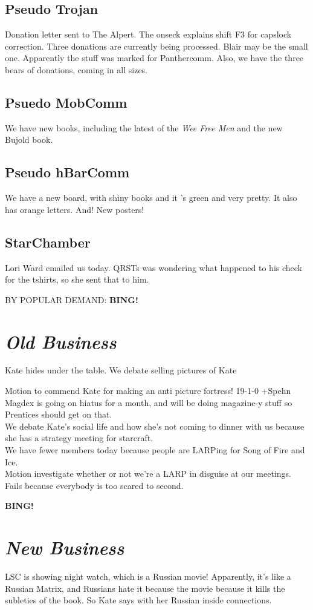 \documentclass[10pt]{article}
\newcommand{\bing}{{\bf BING!} }
\newcommand{\goto}[1]{\bing \vskip 12pt \section*{{\em{#1}}}}
\begin{document}
\subsection*{Pseudo Trojan}
Donation letter sent to The Alpert. The onseck explains shift F3 for
capslock correction. Three donations are currently being processed.
Blair may be the small one. Apparently the stuff was marked for
Panthercomm.  Also, we have the three bears of donations, coming in
all sizes.


\subsection*{Psuedo MobComm}
We have new books, including the latest of the \emph{Wee Free Men} and the new Bujold book. 

\subsection*{Pseudo hBarComm}
We have a new board, with shiny books and it 's green and very pretty. It also has orange letters. And! New posters!

\subsection*{StarChamber}
Lori Ward emailed us today. QRSTs was wondering what happened to his check for the tshirts, so she sent that to him.

BY POPULAR DEMAND:
\goto{Old Business}
Kate hides under the table. We debate selling pictures of Kate

Motion to commend Kate for making an anti picture fortress! 19-1-0 +Spehn\\
Magdex is going on hiatus for a month, and will be doing magazine-y stuff so Prentices should get on that. \\
We debate Kate's social life and how she's not coming to dinner with us because she has a strategy meeting for starcraft.\\
We have fewer members today because people are LARPing for Song of Fire and Ice.\\
Motion investigate whether or not we're a LARP in disguise at our meetings. Fails because everybody is too scared to second. 

\goto{New Business}
LSC is showing night watch, which is a Russian movie! Apparently, it's like a Russian Matrix, and Russians hate it because the movie because it kills the subleties of the book. So Kate says with her Russian inside connections.
\end{document}
